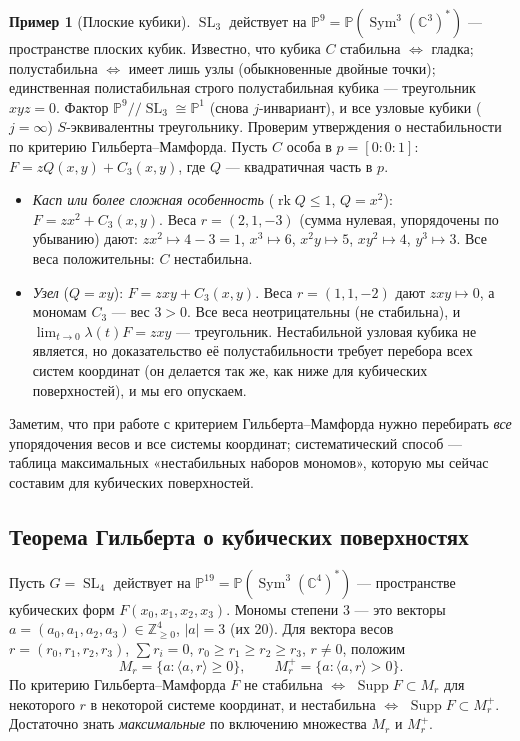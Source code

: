 \documentclass[11pt,a4paper]{article}
\theoremstyle{plain}
\theoremstyle{definition}
\newtheorem{example}[theorem]{Пример}
\theoremstyle{remark}
\renewcommand{\C}{\mathbb{C}}
\newcommand{\Z}{\mathbb{Z}}
\newcommand{\PP}{\mathbb{P}}
\DeclareMathOperator{\rk}{rk}
\DeclareMathOperator{\SL}{SL}
\DeclareMathOperator{\Sym}{Sym}
\DeclareMathOperator{\Supp}{Supp}
\begin{document}
\begin{example}[Плоские кубики]\label{ex:plane-cubics}
$\SL_3$ действует на $\PP^9=\PP(\Sym^3(\C^3)^*)$ --- пространстве плоских кубик. Известно, что
кубика $C$ стабильна $\iff$ гладка; полустабильна $\iff$ имеет лишь узлы (обыкновенные двойные
точки); единственная полистабильная строго полустабильная кубика --- треугольник $xyz=0$. Фактор
$\PP^9/\!/\SL_3\cong\PP^1$ (снова $j$-инвариант), и все узловые кубики ($j=\infty$)
$S$-эквивалентны треугольнику. Проверим утверждения о нестабильности по критерию Гильберта--Мамфорда.
Пусть $C$ особа в $p=[0:0:1]$: $F=zQ(x,y)+C_3(x,y)$, где $Q$ --- квадратичная часть в $p$.
\begin{itemize}
\item \emph{Касп или более сложная особенность} ($\rk Q\le1$, $Q=x^2$): $F=zx^2+C_3(x,y)$. Веса $r=(2,1,-3)$ (сумма
нулевая, упорядочены по убыванию) дают: $zx^2\mapsto4-3=1$, $x^3\mapsto6$, $x^2y\mapsto5$,
$xy^2\mapsto4$, $y^3\mapsto3$. Все веса положительны: $C$ нестабильна.
\item \emph{Узел} ($Q=xy$): $F=zxy+C_3(x,y)$. Веса $r=(1,1,-2)$ дают $zxy\mapsto0$, а мономам
$C_3$ --- вес $3>0$. Все веса неотрицательны (не стабильна), и
$\lim_{t\to0}\lambda(t)F=zxy$ --- треугольник. Нестабильной узловая кубика не является, но
доказательство её полустабильности требует перебора всех систем координат (он делается так же, как
ниже для кубических поверхностей), и мы его опускаем.
\end{itemize}
Заметим, что при работе с критерием Гильберта--Мамфорда нужно перебирать \emph{все} упорядочения
весов и все системы координат; систематический способ --- таблица максимальных «нестабильных
наборов мономов», которую мы сейчас составим для кубических поверхностей.
\end{example}

\subsection{Теорема Гильберта о кубических поверхностях}\label{ss:Hilbert-cubic}

Пусть $G=\SL_4$ действует на $\PP^{19}=\PP(\Sym^3(\C^4)^*)$ --- пространстве кубических форм
$F(x_0,x_1,x_2,x_3)$. Мономы степени 3 --- это векторы $a=(a_0,a_1,a_2,a_3)\in\Z_{\ge0}^4$,
$|a|=3$ (их 20). Для вектора весов $r=(r_0,r_1,r_2,r_3)$, $\sum r_i=0$, $r_0\ge r_1\ge r_2\ge r_3$,
$r\ne0$, положим
\[
M_r=\{a:\langle a,r\rangle\ge0\},\qquad M_r^+=\{a:\langle a,r\rangle>0\}.
\]
По критерию Гильберта--Мамфорда $F$ не стабильна $\iff$ $\Supp F\subset M_r$ для некоторого $r$ в
некоторой системе координат, и нестабильна $\iff$ $\Supp F\subset M^+_r$. Достаточно знать
\emph{максимальные} по включению множества $M_r$ и $M_r^+$.
\end{document}
